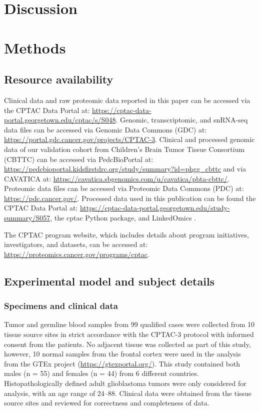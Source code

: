 \section{Discussion}



\section{Methods}
\tightlists

\subsection{Resource availability}
Clinical data and raw proteomic data reported in this paper can be accessed via the CPTAC Data Portal at: \url{https://cptac-data-portal.georgetown.edu/cptac/s/S048}. Genomic, transcriptomic, and snRNA-seq data files can be accessed via Genomic Data Commons (GDC) at: \url{https://portal.gdc.cancer.gov/projects/CPTAC-3}. Clinical and processed genomic data of our validation cohort from Children’s Brain Tumor Tissue Consortium (CBTTC) can be accessed via PedcBioPortal at: \url{https://pedcbioportal.kidsfirstdrc.org/study/summary?id=phgg_cbttc} and via CAVATICA at: \url{https://cavatica.sbgenomics.com/u/cavatica/pbta-cbttc/}. Proteomic data files can be accessed via Proteomic Data Commons (PDC) at: \url{https://pdc.cancer.gov/}. Processed data used in this publication can be found the CPTAC Data Portal at: \url{https://cptac-data-portal.georgetown.edu/study-summary/S057}, the cptac Python package, and LinkedOmics \cite{vasaikarsv_zhangb:LinkedOmicsAnalyzing2018}.

The CPTAC program website, which includes details about program initiatives, investigators, and datasets, can be accessed at: \url{https://proteomics.cancer.gov/programs/cptac}.


\subsection{Experimental model and subject details}

\subsubsection{Specimens and clinical data}
Tumor and germline blood samples from 99 qualified cases were collected from 10 tissue source sites in strict accordance with the CPTAC-3 protocol with informed consent from the patients. No adjacent tissue was collected as part of this study, however, 10 normal samples from the frontal cortex were used in the analysis from the GTEx project (\url{https://gtexportal.org/}). This study contained both males (n = 55) and females (n = 44) from 6 different countries. Histopathologically defined adult glioblastoma tumors were only considered for analysis, with an age range of 24--88. Clinical data were obtained from the tissue source sites and reviewed for correctness and completeness of data.

